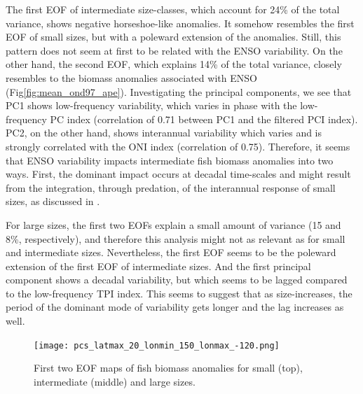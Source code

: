 The first EOF of intermediate size-classes, which account for 24\% of the total variance, shows negative horseshoe-like anomalies. It somehow resembles the first EOF of small sizes, but with a poleward extension of the anomalies. Still, this pattern does not seem at first to be related with the ENSO variability. On the other hand, the second EOF, which explains 14\% of the total variance, closely resembles to the biomass anomalies associated with ENSO (Fig\ref{fig:mean_ond97_ape}). Investigating the principal components, we see that PC1 shows low-frequency variability, which varies in phase with the low-frequency PC index (correlation of 0.71 between PC1 and the filtered PCI index). PC2, on the other hand, shows interannual variability which varies and is strongly correlated with the ONI index (correlation of 0.75). Therefore, it seems that ENSO variability impacts intermediate fish biomass anomalies into two ways. First, the dominant impact occurs at decadal time-scales and might result from the integration, through predation, of the interannual response of small sizes, as discussed in \cite{lorenzoDoubleintegrationHypothesisExplain2013}. 

For large sizes, the first two EOFs explain a small amount of variance (15 and 8\%, respectively), and therefore this analysis might not as relevant as for small and intermediate sizes. Nevertheless, the first EOF seems to be the poleward extension of the first EOF of intermediate sizes. And the first principal component shows a decadal variability, but which seems to be lagged compared to the low-frequency TPI index. This seems to suggest that as size-increases, the period of the dominant mode of variability gets longer and the lag increases as well.


\begin{figure}
    \centering
    \texttt{[image: pcs\_latmax\_20\_lonmin\_150\_lonmax\_-120.png]}
    \caption{First two EOF maps of fish biomass anomalies for small (top), intermediate (middle) and large sizes.}
    \label{fig:eofpcs}
\end{figure}


